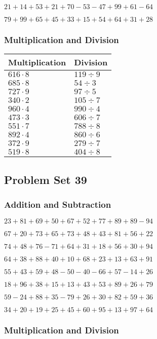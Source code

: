 \(21+14+53+21+70-53-47+99+61-64\)

\(79+99+65+45+33+15+54+64+31+28\)

\hypertarget{multiplication-and-division-37}{%
\subsubsection{Multiplication and
Division}\label{multiplication-and-division-37}}

\begin{longtable}[]{@{}ll@{}}
\toprule
Multiplication & Division\tabularnewline
\midrule
\endhead
\(616\cdot8\) & \(119÷9\)\tabularnewline
\(685\cdot8\) & \(54÷3\)\tabularnewline
\(727\cdot9\) & \(97÷5\)\tabularnewline
\(340\cdot2\) & \(105÷7\)\tabularnewline
\(960\cdot4\) & \(990÷4\)\tabularnewline
\(473\cdot3\) & \(606÷7\)\tabularnewline
\(551\cdot7\) & \(788÷8\)\tabularnewline
\(892\cdot4\) & \(860÷6\)\tabularnewline
\(372\cdot9\) & \(279÷7\)\tabularnewline
\(519\cdot8\) & \(404÷8\)\tabularnewline
\bottomrule
\end{longtable}

\hypertarget{problem-set-39}{%
\subsection{Problem Set 39}\label{problem-set-39}}

\hypertarget{addition-and-subtraction-38}{%
\subsubsection{Addition and
Subtraction}\label{addition-and-subtraction-38}}

\(23+81+69+50+67+52+77+89+89-94\)

\(67+20+73+65+73+48+43+81+56+22\)

\(74+48+76-71+64+31+18+56+30+94\)

\(64+38+88+40+10+68+23+13+63+91\)

\(55+43+59+48-50-40-66+57-14+26\)

\(18+96+38+15+13+43+53+89+26+79\)

\(59-24+88+35-79+26+30+82+59+36\)

\(34+20+19+25+45+60+95+13+97+64\)

\hypertarget{multiplication-and-division-38}{%
\subsubsection{Multiplication and
Division}\label{multiplication-and-division-38}}

